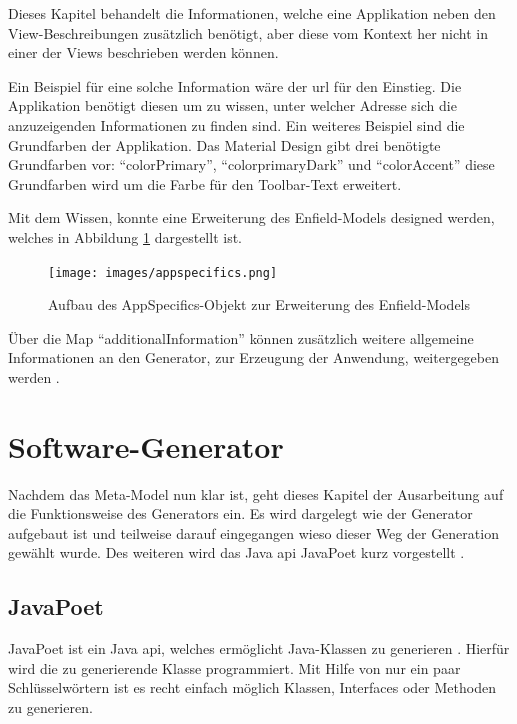 Dieses Kapitel behandelt die Informationen, welche eine Applikation neben den View-Beschreibungen zusätzlich benötigt, aber diese vom Kontext her nicht in einer der Views beschrieben werden können.

Ein Beispiel für eine solche Information wäre der \acf{url} für den Einstieg. Die Applikation benötigt diesen um zu wissen, unter welcher Adresse sich die anzuzeigenden Informationen zu finden sind. Ein weiteres Beispiel sind die Grundfarben der Applikation. Das Material Design gibt drei benötigte Grundfarben vor: \enquote{colorPrimary}, \enquote{colorprimaryDark} und \enquote{colorAccent} diese Grundfarben wird um die Farbe für den Toolbar-Text erweitert.

Mit dem Wissen, konnte eine Erweiterung des Enfield-Models designed werden, welches in Abbildung \ref{fig:appspecifics} dargestellt ist.

\begin{figure}[H]
	\begin{center}
		\texttt{[image: images/appspecifics.png]}
		\caption{Aufbau des AppSpecifics-Objekt  zur Erweiterung des Enfield-Models}
		\label{fig:appspecifics}
	\end{center}
\end{figure}

 Über die Map \enquote{additionalInformation} können zusätzlich weitere allgemeine Informationen an den Generator, zur Erzeugung der Anwendung, weitergegeben werden .

\section{Software-Generator}

Nachdem das Meta-Model nun klar ist, geht dieses Kapitel der Ausarbeitung auf die Funktionsweise des Generators ein. 
Es wird dargelegt wie der Generator aufgebaut ist und teilweise darauf eingegangen wieso dieser Weg der Generation gewählt wurde. Des weiteren wird das Java \acf{api} JavaPoet kurz vorgestellt \cite{poet}.

\subsection{JavaPoet}
JavaPoet ist ein Java \ac{api}, welches ermöglicht Java-Klassen zu generieren \cite{poet}. Hierfür wird die zu generierende Klasse programmiert. Mit Hilfe von nur ein paar Schlüsselwörtern ist es recht einfach möglich Klassen, Interfaces oder Methoden zu generieren. 

